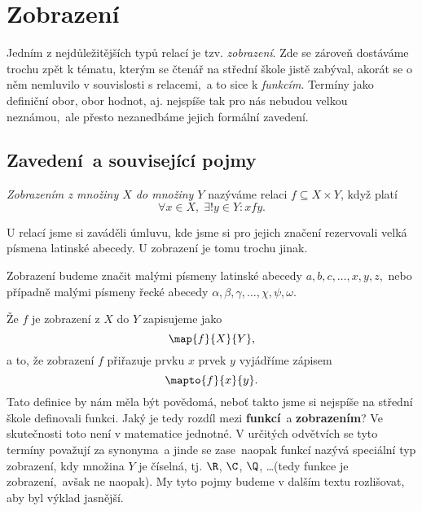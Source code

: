 \section{Zobrazení}\label{sec:zobrazeni}
Jedním z nejdůležitějších typů relací je tzv. \emph{zobrazení}. Zde se zároveň dostáváme trochu zpět k tématu, kterým se čtenář na střední škole jistě zabýval, akorát se o něm nemluvilo v souvislosti s relacemi,~a to sice k \emph{funkcím}. Termíny jako definiční obor, obor hodnot, aj. nejspíše tak pro nás nebudou velkou neznámou,~ale přesto nezanedbáme jejich formální zavedení.

\subsection{Zavedení~a související pojmy}
\begin{definition}[Zobrazení]\label{def:zobrazeni}
    \emph{Zobrazením z množiny $X$ do množiny $Y$} nazýváme relaci $f\subseteq X\times Y$, když platí
    \begin{equation*}
        \forall x\in X,\; \exists! y\in Y: xfy.
    \end{equation*}
\end{definition}
U relací jsme si zaváděli úmluvu, kde jsme si pro jejich značení rezervovali velká písmena latinské abecedy. U zobrazení je tomu trochu jinak.
\begin{convention}
    \sloppy Zobrazení budeme značit malými písmeny latinské abecedy $a,b,c,\dots,x,y,z$,~nebo případně malými písmeny řecké abecedy $\alpha,\beta,\gamma,\dots,\chi,\psi,\omega$.
\end{convention}
Že $f$ je zobrazení z $X$ do $Y$ zapisujeme jako
\begin{equation*}
    \map{f}{X}{Y},
\end{equation*}
a to, že zobrazení $f$ přiřazuje prvku $x$ prvek $y$ vyjádříme zápisem
\begin{equation*}
    \mapto{f}{x}{y}.
\end{equation*}
Tato definice by nám měla být povědomá, neboť takto jsme si nejspíše na střední škole definovali funkci. Jaký je tedy rozdíl mezi \textbf{funkcí}~a \textbf{zobrazením}? Ve skutečnosti toto není v matematice jednotné. V určitých odvětvích se tyto termíny považují za synonyma~a jinde se zase~naopak funkcí nazývá speciální typ zobrazení, kdy množina $Y$ je číselná, tj. $\R$, $\C$, $\Q$, \dots (tedy funkce je zobrazení,~avšak ne naopak). My tyto pojmy budeme v dalším textu rozlišovat, aby byl výklad jasnější.\par
